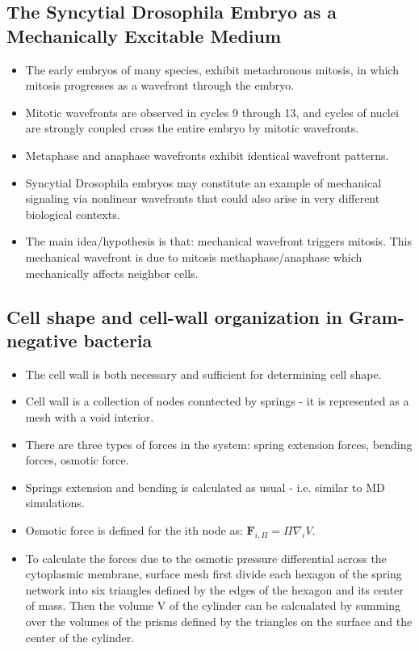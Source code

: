 \documentclass[10pt,a4paper]{article}
\begin{document}
 \subsection{The Syncytial Drosophila Embryo as a Mechanically Excitable Medium \cite{liu:13}}
 \begin{itemize}
  \item The early embryos of many species, exhibit metachronous mitosis, in which mitosis progresses as a wavefront through the embryo.
  \item Mitotic wavefronts are observed in cycles 9 through 13, and cycles of nuclei are strongly coupled cross the entire embryo by mitotic wavefronts.
  \item Metaphase and anaphase wavefronts exhibit identical wavefront patterns.
  \item Syncytial Drosophila embryos may constitute an example of mechanical signaling via nonlinear wavefronts that could also arise in very different biological contexts.
  \item The main idea/hypothesis is that: mechanical wavefront triggers mitosis. This mechanical wavefront is due to mitosis methaphase/anaphase which mechanically  affects neighbor cells.  
 \end{itemize}

 \subsection{Cell shape and cell-wall organization in Gram-negative bacteria\cite{w08, w11a, w11b}}
 \begin{itemize}
  \item The cell wall is both necessary and sufficient for determining cell shape.
  \item Cell wall is a collection of nodes conntected by springs - it is represented as a mesh with a void interior.
  \item There are three types of forces in the system: spring extension forces, bending forces, osmotic force.
  \item Springs extension and bending is calculated as usual - i.e. similar to MD simulations.
  \item Osmotic force is defined for the ith node as: $\mathbf{F}_{i,\Pi} = \Pi \nabla_i V$.
  \item To calculate the forces due to the osmotic pressure differential across the cytoplasmic membrane, 
  surface mesh first divide each hexagon of the spring network into six triangles defined by the edges of the hexagon and its center of mass. 
  Then the volume V of the cylinder can be calcualated by summing over the volumes of the prisms defined by the triangles on 
  the surface and the center of the cylinder.
 \end{itemize}
 
\end{document}
